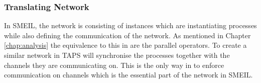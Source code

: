 


\subsubsection{Translating Network}
In SMEIL, the network is consisting of instances which are instantiating processes while also defining the communication of the network. As mentioned in Chapter \ref{chap:analysis} the equivalence to this in \cspm{} are the parallel operators. To create a similar network in \cspm{} TAPS will synchronise the processes together with the channels they are communicating on.
This is the only way in \cspm{} to enforce communication on channels which is the essential part of the network in SMEIL.


